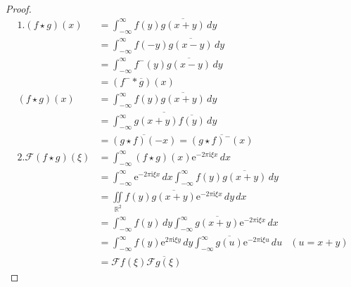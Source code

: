 \begin{proof}
\begin{align*}
    1.(f\star g)(x)               & =\int_{-\infty}^{\infty}f(y)\overline{g(x+y)}\,dy                                                                   \\
                                  & =\int_{-\infty}^{\infty}f(-y)\overline{g(x-y)}\,dy                                                                  \\
                                  & =\int_{-\infty}^{\infty}f^-(y)\overline{g(x-y)}\,dy                                                                  \\
                                  & = (f^- * \overline{g})(x)                                                                                           \\
    (f\star g)(x)                 & =\int_{-\infty}^{\infty}f(y)\overline{g(x+y)}\,dy                                                                   \\
                                  & =\overline{\int_{-\infty}^{\infty}g(x+y)\overline{f(y)}\,dy}                                                        \\
                                  & =\overline{(g\star f)(-x)}=\overline{(g\star f)^-(x)}                                                               \\
    2.\mathcal{F} (f\star g)(\xi) & =\int_{-\infty}^{\infty}(f\star g)(x)\mathrm{e}^{-2\pi \mathrm{i}\xi x}\,dx                                                           \\
                                  & =\int_{-\infty}^{\infty}\mathrm{e}^{-2\pi \mathrm{i}\xi x}\,dx\int_{-\infty}^{\infty}f(y)\overline{g(x+y)}\,dy                        \\
                                  & =\iint\limits_{\mathbb{R}^2}f(y)\overline{g(x+y)}\mathrm{e}^{-2\pi \mathrm{i}\xi x}\,dy\,dx                                           \\
                                  & =\int_{-\infty}^{\infty}f(y)\,dy\int_{-\infty}^{\infty}\overline{g(x+y)}\mathrm{e}^{-2\pi \mathrm{i}\xi x}\,dx                        \\
                                  & =\int_{-\infty}^{\infty}f(y)\mathrm{e}^{2\pi \mathrm{i}\xi y}\,dy\int_{-\infty}^{\infty}\overline{g(u)}\mathrm{e}^{-2\pi \mathrm{i}\xi u}\,du & (u=x+y) \\
                                  & =\mathcal{F} f(\xi)\overline{\mathcal{F} g(\xi)}

\end{align*}
\end{proof}
